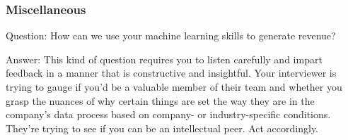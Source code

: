 \documentclass[11pt]{beamer}
\begin{document}
\begin{frame}
\frametitle{Miscellaneous}
\begin{block}{Question:}
	How can we use your machine learning skills to generate revenue?
\end{block}
\begin{block}{Answer:}
	This kind of question requires you to listen carefully and impart feedback in a manner that is constructive and insightful. Your interviewer is trying to gauge if you’d be a valuable member of their team and whether you grasp the nuances of why certain things are set the way they are in the company’s data process based on company- or industry-specific conditions. They’re trying to see if you can be an intellectual peer. Act accordingly.
\end{block}
\end{frame}
\end{document}
